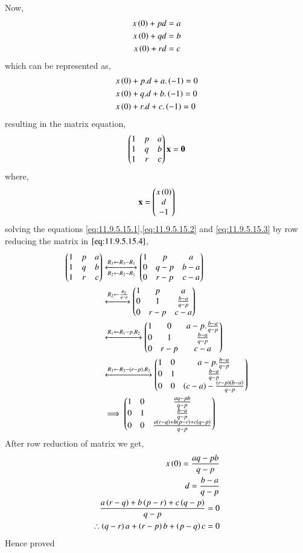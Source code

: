 \documentclass[journal,12pt,onecolumn]{IEEEtran}
\theoremstyle{remark}
\begin{document}
Now,
\begin{align}
    x\left(0\right)+pd &= a \label{eq:11.9.5.15.1} \\
    x\left(0\right)+qd &= b \label{eq:11.9.5.15.2} \\
    x\left(0\right)+rd &= c \label{eq:11.9.5.15.3} 
\end{align}
which can be represented as,
\begin{align}
    &x\left(0\right)+p.d+a.\left(-1\right)=0\\
    &x\left(0\right)+q.d+b.\left(-1\right)=0\\
    &x\left(0\right)+r.d+c.\left(-1\right)=0
\end{align}
resulting in the matrix equation,
\begin{align}
    \begin{pmatrix}1&p&a\\1&q&b\\1&r&c\\\end{pmatrix}\mathbf{x}=\mathbf{0}\label{eq:11.9.5.15.4}
\end{align}
where,
\begin{align}
    \mathbf{x}=\begin{pmatrix}x\left(0\right)\\d\\-1\end{pmatrix}
\end{align}
solving the equations \eqref{eq:11.9.5.15.1},\eqref{eq:11.9.5.15.2} and \eqref{eq:11.9.5.15.3} by row reducing the matrix in $\eqref{eq:11.9.5.15.4}$,
    \begin{align}
    \begin{pmatrix}
        1&p&a\\
        1&q&b\\
        1&r&c\\
    \end{pmatrix}
    &\xleftrightarrow[R_{2}\leftarrow R_2 - R_1]{ R_{3}\leftarrow R_3 - R_1}
    \begin{pmatrix}
        1&p&a\\
        0&q-p&b-a\\
        0&r-p&c-a\\
    \end{pmatrix}\\
   &\xleftrightarrow{R_{2}\leftarrow \frac{R_2}{q-p}} 
    \begin{pmatrix}
        1&p&a\\
        0&1&\frac{b-a}{q-p}\\
        0&r-p&c-a\\
    \end{pmatrix}\\
    &\xleftrightarrow{R_1\leftarrow R_1 - p.R_2}
    \begin{pmatrix}
       1&0&a- p. \frac{b-a}{q-p}\\
       0&1&\frac{b-a}{q-p}\\
       0&r-p&c-a\\
    \end{pmatrix}\\
    &\xleftrightarrow{R_{3}\leftarrow R_{3}-\ensuremath{\left(r-p\right)}.R_2}
    \begin{pmatrix}
       1&0&a- p. \frac{b-a}{q-p}\\
       0&1&\frac{b-a}{q-p}\\
       0&0&\left(c-a\right) - \frac{\left(r-p\right)\left(b-a\right)}{q-p}\\
    \end{pmatrix}\\
    &\implies
    \begin{pmatrix}
          1&0&\frac{aq-pb}{q-p}\\
       0&1&\frac{b-a}{q-p}\\
       0&0&\frac{a\left(r-q\right) + b\left(p-r\right) + c\left(q-p\right)}{q-p}\\
    \end{pmatrix}
\end{align}
After row reduction of matrix we get,
\begin{align}
    x\left(0\right)=\frac{aq-pb}{q-p}\\
    d=\frac{b-a}{q-p}\\
    \frac{a\left(r-q\right) + b\left(p-r\right) + c\left(q-p\right)}{q-p}=0\\
    \therefore{\ensuremath{\left(q-r\right)}a + \ensuremath{\left(r-p\right)}b +\ensuremath{\left(p-q\right)}c =0}
\end{align}
Hence proved
\end{document}
